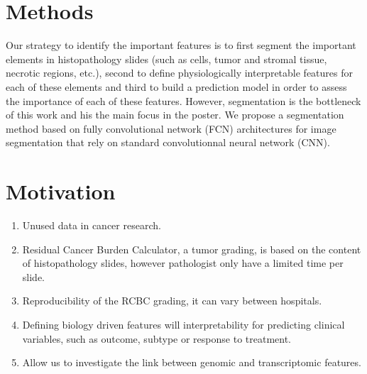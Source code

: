 \documentclass[a0,portrait]{a0poster}
\begin{document}
\begin{multicols}{2}



\color{SaddleBrown} %

\section*{Methods}

Our strategy to identify the important features is to first segment the important elements in histopathology slides (such as cells, tumor and stromal tissue, necrotic regions, etc.), second to define physiologically interpretable features for each of these elements and third to build a prediction model in order to assess the importance of each of these features. However, segmentation is the bottleneck of this work and his the main focus in the poster.
We propose a segmentation method based on fully convolutional network (FCN)  architectures for image segmentation that rely on standard convolutionnal neural network (CNN).

\color{DarkSlateGray} %

\section*{Motivation}

\begin{enumerate}
\item Unused data in cancer research.
\item Residual Cancer Burden Calculator, a tumor grading, is based on the content of histopathology slides, however pathologist only have a limited time per slide.
\item Reproducibility of the RCBC grading, it can vary between hospitals.
\item Defining biology driven features will interpretability for predicting clinical variables, such as outcome, subtype or response to treatment.
\item Allow us to investigate the link between genomic and transcriptomic features.
\end{enumerate}


\end{multicols}
\end{document}
